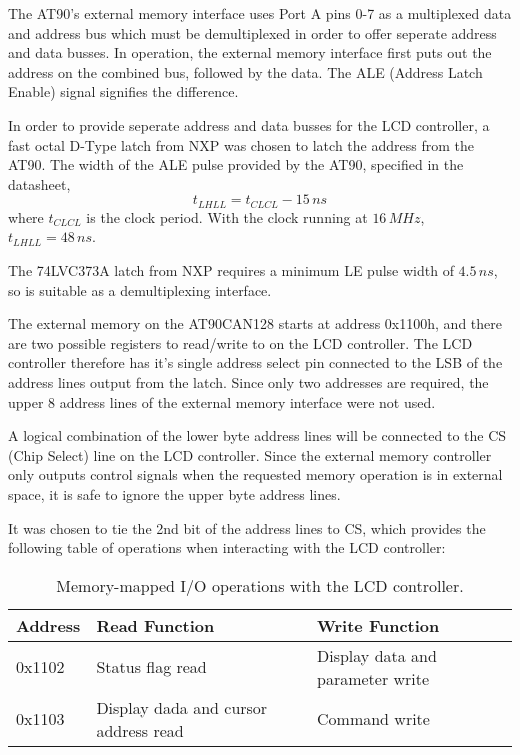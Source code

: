 \documentclass[a4paper,10pt]{scrreprt}
\begin{document}
The AT90's external memory interface uses Port A pins 0-7 as a multiplexed data and address bus which must be demultiplexed in order to offer seperate address and data busses. In operation, the external memory interface first puts out the address on the combined bus, followed by the data. The ALE (Address Latch Enable) signal signifies the difference.

In order to provide seperate address and data busses for the LCD controller, a fast octal D-Type latch from NXP was chosen to latch the address from the AT90. The width of the ALE pulse provided by the AT90, specified in the datasheet,
\begin{equation}
 t_{LHLL}=t_{CLCL}-15\,ns
\end{equation}
where $t_{CLCL}$ is the clock period. With the clock running at $16\,MHz$, $t_{LHLL}=48\,ns$.

The 74LVC373A latch from NXP requires a minimum LE pulse width of $4.5\,ns$, so is suitable as a demultiplexing interface.

The external memory on the AT90CAN128 starts at address 0x1100h, and there are two possible registers to read/write to on the LCD controller. The LCD controller therefore has it's single address select pin connected to the LSB of the address lines output from the latch. Since only two addresses are required, the upper 8 address lines of the external memory interface were not used.

A logical combination of the lower byte address lines will be connected to the CS (Chip Select) line on the LCD controller. Since the external memory controller only outputs control signals when the requested memory operation is in external space, it is safe to ignore the upper byte address lines.

It was chosen to tie the 2nd bit of the address lines to CS, which provides the following table of operations when interacting with the LCD controller:

\begin{table}
  \begin{center}
    \caption{Memory-mapped I/O operations with the LCD controller.}
    \begin{tabular}{|l|l|l|}
      \hline
      Address & Read Function & Write Function\\
      \hline
      \hline
      0x1102 & Status flag read & Display data and parameter write\\
      \hline
      0x1103 & Display dada and cursor address read & Command write\\
      \hline
    \end{tabular}
  \end{center}
\end{table} 
\end{document}
